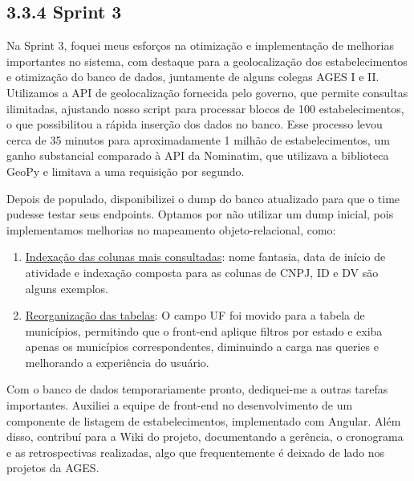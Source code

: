 \hypertarget{__RefHeading___Toc4791_3118176633}{}
\subsection*{3.3.4 Sprint 3}
\label{unit:ages-ii-sprint-3}

\indent Na Sprint 3, foquei meus esforços na otimização e implementação de melhorias importantes no sistema, com destaque para a geolocalização dos estabelecimentos e otimização do banco de dados, juntamente de alguns colegas AGES I e II. Utilizamos a API de geolocalização fornecida pelo governo, que permite consultas ilimitadas, ajustando nosso script para processar blocos de 100 estabelecimentos, o que possibilitou a rápida inserção dos dados no banco. Esse processo levou cerca de 35 minutos para aproximadamente 1 milhão de estabelecimentos, um ganho substancial comparado à API da Nominatim, que utilizava a biblioteca GeoPy e limitava a uma requisição por segundo.\par

\indent Depois de populado, disponibilizei o dump do banco atualizado para que o time pudesse testar seus endpoints. Optamos por não utilizar um dump inicial, pois implementamos melhorias no mapeamento objeto-relacional, como:\par

\begin{enumerate}
\item \underline{Indexação das colunas mais consultadas}: nome fantasia, data de início de atividade e indexação composta para as colunas de CNPJ, ID e DV são alguns exemplos.\par

\item \underline{Reorganização das tabelas}: O campo UF foi movido para a tabela de municípios, permitindo que o front-end aplique filtros por estado e exiba apenas os municípios correspondentes, diminuindo a carga nas queries e melhorando a experiência do usuário.\par

\end{enumerate}

\indent Com o banco de dados temporariamente pronto, dediquei-me a outras tarefas importantes. Auxiliei a equipe de front-end no desenvolvimento de um componente de listagem de estabelecimentos, implementado com Angular. Além disso, contribuí para a Wiki do projeto, documentando a gerência, o cronograma e as retrospectivas realizadas, algo que frequentemente é deixado de lado nos projetos da AGES.\par

